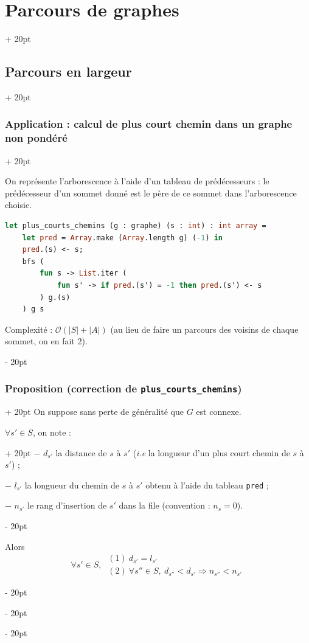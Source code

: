 \documentclass[a4paper, 12pt, twoside]{article}
\newcommand{\lr}[1]{\left( #1 \right)}
\newcommand{\abs}[1]{\left\lvert #1 \right\rvert}
\newcommand{\ind}[1][20pt]{\advance\leftskip + #1}
\newcommand{\deind}[1][20pt]{\advance\leftskip - #1}
\newenvironment{indt}[2][20pt]{#2 \par \ind[#1]}{\par \deind} %
\begin{document}
\begin{indt}{\section{Parcours de graphes}}
\begin{indt}{\subsection{Parcours en largeur}}
\begin{indt}{\subsubsection{Application : calcul de plus court chemin dans un graphe non pondéré}}
\begin{center}
                \end{center}

                On représente l'arborescence à l'aide d'un tableau de prédécesseurs : le prédécesseur d'un sommet donné est le père de ce sommet dans l'arborescence choisie.

                \begin{lstlisting}[language=Caml, xleftmargin=80pt]
let plus_courts_chemins (g : graphe) (s : int) : int array =
    let pred = Array.make (Array.length g) (-1) in
    pred.(s) <- s;
    bfs (
        fun s -> List.iter (
            fun s' -> if pred.(s') = -1 then pred.(s') <- s
        ) g.(s)
    ) g s\end{lstlisting}

                Complexité : $\mathcal O\!\lr{\abs S + \abs A}$ (au lieu de faire un parcours des voisins de chaque sommet, on en fait 2).
            \end{indt}

            \vspace{12pt}
            
            \begin{indt}{\subsubsection{Proposition (correction de \texttt{plus\_courts\_chemins})}}
                On suppose sans perte de généralité que $G$ est connexe.

                \begin{indt}{$\forall s' \in S$, on note :}
                    $-$ $d_{s'}$ la distance de $s$ à $s'$ (\textit{i.e} la longueur d'un plus court chemin de $s$ à $s'$) ;

                    $-$ $l_{s'}$ la longueur du chemin de $s$ à $s'$ obtenu à l'aide du tableau \texttt{pred} ;

                    $-$ $n_{s'}$ le rang d'insertion de $s'$ dans la file (convention : $n_s = 0$).
                \end{indt}

                Alors
                \[
                    \forall s' \in S,\
                    \begin{array}{l}
                        (1)\ d_{s'} = l_{s'}
                        \\
                        (2)\ \forall s'' \in S,\ d_{s''} < d_{s'} \Rightarrow n_{s''} < n_{s'}
                    \end{array}
                \]


\end{indt}
\end{indt}
\end{indt}
\end{document}
